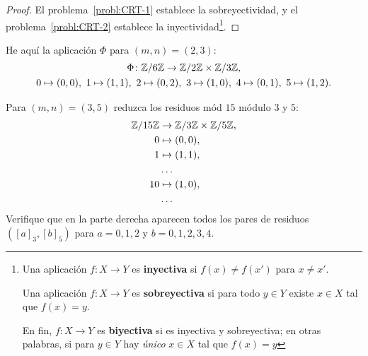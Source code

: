 \documentclass{article}
\begin{document}
\begin{proof}
  El problema~\ref{probl:CRT-1} establece la sobreyectividad,
  y el problema~\ref{probl:CRT-2} establece la inyectividad\footnote{Una
    aplicación $f\colon X\to Y$ es \textbf{inyectiva} si $f (x) \ne f (x')$ para
    $x \ne x'$.

    Una aplicación $f\colon X\to Y$ es \textbf{sobreyectiva} si para todo
    $y \in Y$ existe $x \in X$ tal que $f (x) = y$.

    En fin, $f\colon X\to Y$ es \textbf{biyectiva} si es inyectiva y
    sobreyectiva; en otras palabras, si para $y \in Y$ hay \emph{único}
    $x \in X$ tal que $f (x) = y$}.
\end{proof}

\begin{ejemplo}
  He aquí la aplicación $\Phi$ para $(m,n) = (2,3)$:
  \begin{gather*}
    \Phi\colon \mathbb{Z}/6\mathbb{Z} \to \mathbb{Z}/2\mathbb{Z} \times \mathbb{Z}/3\mathbb{Z},\\
    0 \mapsto (0,0), ~
    1 \mapsto (1,1), ~
    2 \mapsto (0,2), ~
    3 \mapsto (1,0), ~
    4 \mapsto (0,1), ~
    5 \mapsto (1,2).
  \end{gather*}
\end{ejemplo}

\begin{problema}
  Para $(m,n) = (3,5)$ reduzca los residuos mód $15$ módulo $3$ y $5$:
  \begin{align*}
    \mathbb{Z}/15\mathbb{Z} & \to \mathbb{Z}/3\mathbb{Z} \times \mathbb{Z}/5\mathbb{Z}, \\
    0 & \mapsto (0,0), \\
    1 & \mapsto (1,1), \\
              & \ldots \\
    10 & \mapsto (1,0), \\
      & \ldots
  \end{align*}
  Verifique que en la parte derecha aparecen todos los pares de residuos
  $([a]_3, [b]_5)$ para $a = 0,1,2$ y $b = 0,1,2,3,4$.
\end{problema}
\end{document}
